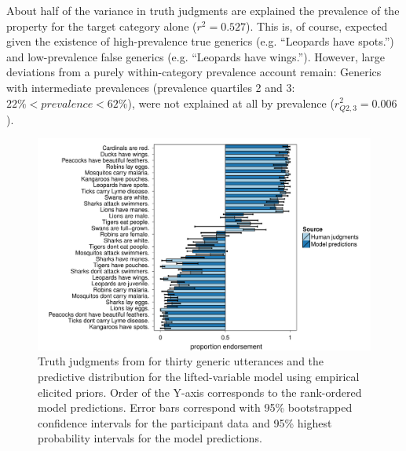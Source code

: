 \documentclass[10pt,letterpaper]{article}
\begin{document}
About half of the variance in truth judgments are explained the prevalence of the property for the target category alone ($r^2 = 0.527$). 
This is, of course, expected given the existence of high-prevalence true generics (e.g. ``Leopards have spots.'') and low-prevalence false generics (e.g. ``Leopards have wings.''). 
However, large deviations from a purely within-category prevalence account remain: Generics with intermediate prevalences (prevalence quartiles 2 and 3: $ 22\% < prevalence < 62\%$), were not explained at all by prevalence ($r_{Q2,3}^2 = 0.006$).

\begin{figure}
\centering
    \includegraphics[width=\columnwidth]{tj_n100-postPred-byItem.pdf}
    \caption{Truth judgments from for thirty generic utterances and the predictive distribution for the lifted-variable model using empirical elicited priors. Order of the Y-axis corresponds to the rank-ordered model predictions. Error bars correspond with 95\% bootstrapped confidence intervals for the participant data and 95\% highest probability intervals for the model predictions.}
  \label{fig:modeldataBars}
\end{figure}

\end{document}
